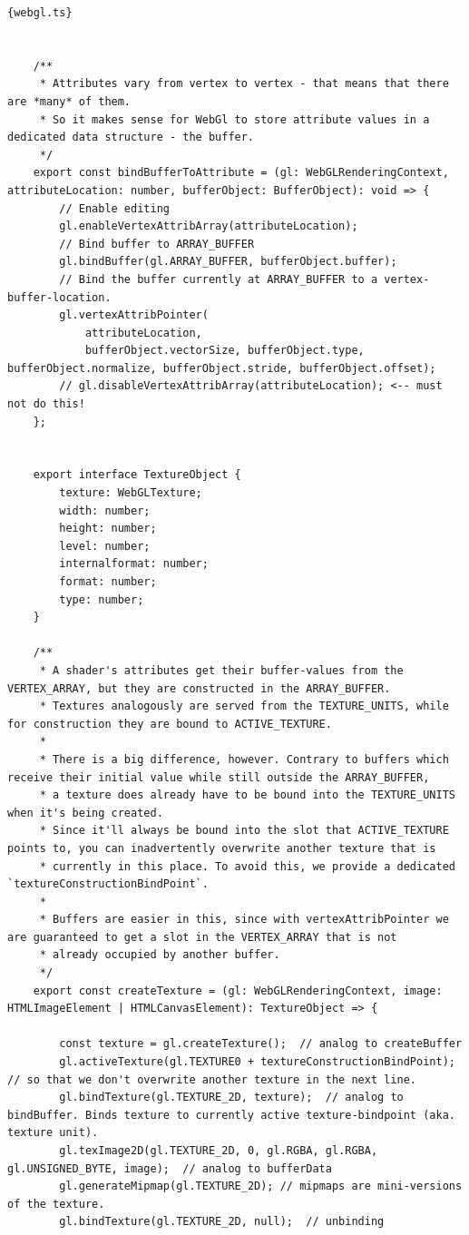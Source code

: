 \begin{lstlisting}{webgl.ts}
    
    
    /**
     * Attributes vary from vertex to vertex - that means that there are *many* of them.
     * So it makes sense for WebGl to store attribute values in a dedicated data structure - the buffer.
     */
    export const bindBufferToAttribute = (gl: WebGLRenderingContext, attributeLocation: number, bufferObject: BufferObject): void => {
        // Enable editing
        gl.enableVertexAttribArray(attributeLocation);
        // Bind buffer to ARRAY_BUFFER
        gl.bindBuffer(gl.ARRAY_BUFFER, bufferObject.buffer);
        // Bind the buffer currently at ARRAY_BUFFER to a vertex-buffer-location.
        gl.vertexAttribPointer(
            attributeLocation,
            bufferObject.vectorSize, bufferObject.type, bufferObject.normalize, bufferObject.stride, bufferObject.offset);
        // gl.disableVertexAttribArray(attributeLocation); <-- must not do this!
    };
    
    
    export interface TextureObject {
        texture: WebGLTexture;
        width: number;
        height: number;
        level: number;
        internalformat: number;
        format: number;
        type: number;
    }
    
    /**
     * A shader's attributes get their buffer-values from the VERTEX_ARRAY, but they are constructed in the ARRAY_BUFFER.
     * Textures analogously are served from the TEXTURE_UNITS, while for construction they are bound to ACTIVE_TEXTURE.
     *
     * There is a big difference, however. Contrary to buffers which receive their initial value while still outside the ARRAY_BUFFER,
     * a texture does already have to be bound into the TEXTURE_UNITS when it's being created.
     * Since it'll always be bound into the slot that ACTIVE_TEXTURE points to, you can inadvertently overwrite another texture that is
     * currently in this place. To avoid this, we provide a dedicated `textureConstructionBindPoint`.
     *
     * Buffers are easier in this, since with vertexAttribPointer we are guaranteed to get a slot in the VERTEX_ARRAY that is not
     * already occupied by another buffer.
     */
    export const createTexture = (gl: WebGLRenderingContext, image: HTMLImageElement | HTMLCanvasElement): TextureObject => {
    
        const texture = gl.createTexture();  // analog to createBuffer
        gl.activeTexture(gl.TEXTURE0 + textureConstructionBindPoint); // so that we don't overwrite another texture in the next line.
        gl.bindTexture(gl.TEXTURE_2D, texture);  // analog to bindBuffer. Binds texture to currently active texture-bindpoint (aka. texture unit).
        gl.texImage2D(gl.TEXTURE_2D, 0, gl.RGBA, gl.RGBA, gl.UNSIGNED_BYTE, image);  // analog to bufferData
        gl.generateMipmap(gl.TEXTURE_2D); // mipmaps are mini-versions of the texture.
        gl.bindTexture(gl.TEXTURE_2D, null);  // unbinding
    

\end{lstlisting}
